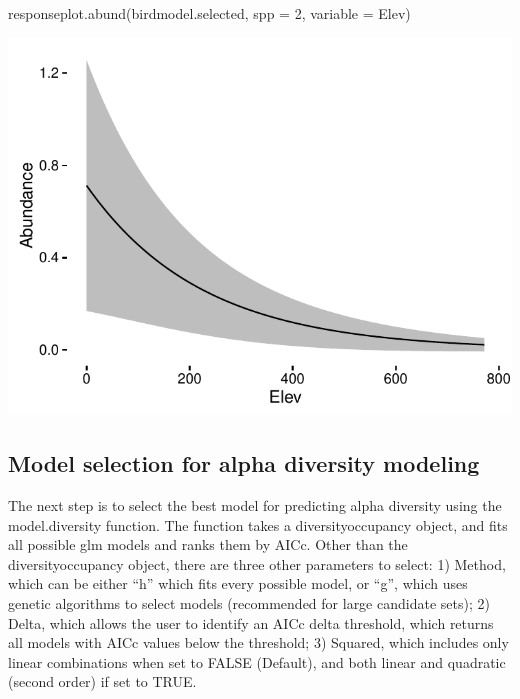 \documentclass[article]{jss}
\begin{document}
\begin{CodeChunk}
\begin{CodeInput}
responseplot.abund(birdmodel.selected, spp = 2, variable = Elev)
\end{CodeInput}


\begin{center}\includegraphics{diversityocc_files/figure-latex/unnamed-chunk-16-1} \end{center}

\end{CodeChunk}

\subsection{Model selection for alpha diversity
modeling}\label{model-selection-for-alpha-diversity-modeling}

The next step is to select the best model for predicting alpha diversity
using the model.diversity function. The function takes a
diversityoccupancy object, and fits all possible glm models and ranks
them by AICc. Other than the diversityoccupancy object, there are three
other parameters to select: 1) Method, which can be either ``h'' which
fits every possible model, or ``g'', which uses genetic algorithms to
select models (recommended for large candidate sets); 2) Delta, which
allows the user to identify an AICc delta threshold, which returns all
models with AICc values below the threshold; 3) Squared, which includes
only linear combinations when set to FALSE (Default), and both linear
and quadratic (second order) if set to TRUE.
\end{document}
